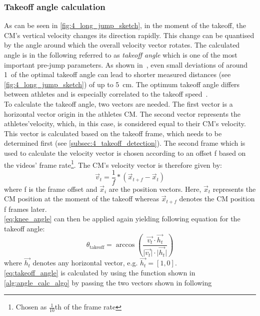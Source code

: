 \subsubsection*{Takeoff angle calculation}
As can be seen in \autoref{fig:4_long_jump_sketch}, in the moment of the
takeoff, the \ac{CM}'s vertical velocity changes its direction rapidly.
This change can be quantised by the angle around which the overall
velocity vector rotates.
The calculated angle is in the following referred to as \textit{takeoff angle}
which is one of the most important pre-jump parameters.
As shown in~\cite{seyfarth_optimum_2000}, even small deviations of around
1\textdegree\ of the optimal takeoff angle can lead to shorter measured
distances (see \autoref{fig:4_long_jump_sketch}) of up to 5~cm.
The optimum takeoff angle differs between athletes and is especially
correlated to the takeoff speed~\cite{tsuboi_mathematical_2010-1}.\\
To calculate the takeoff angle, two vectors are needed.
The first vector is a horizontal vector origin in the athletes \ac{CM}.
The second vector represents the athletes'velocity, which, in this case, 
is considered equal to their \ac{CM}'s velocity.
This vector is calculated based on the takeoff frame, which needs to be
determined first (see \autoref{subsec:4_takeoff_detection}).
The second frame which is used to calculate the velocity vector is chosen
according to an offset f based on the videos' frame
rate\footnote{Chosen as $\frac{1}{10}$th of the frame rate}.
The \ac{CM}'s velocity vector is therefore given by:
\begin{equation}
    \vec{{}v}_t = \frac{1}{f} * (\vec{{}x}_{t+f} - \vec{{}x}_t)
\end{equation}
where f is the frame offset and $\vec{{}x}_i$ are the position vectors.
Here, $\vec{{}x}_t$ represents the \ac{CM} position at the moment of the takeoff
whereas $\vec{{}x}_{t+f}$ denotes the \ac{CM} position f frames later.\\
\autoref{eq:knee_angle} can then be applied again yielding following equation
for the takeoff angle:
\begin{equation}\label{eq:takeoff_angle}
    \theta_{\text{takeoff}} = \arccos\left(\frac{\vec{v_t} \cdot \vec{h_t}}{\lvert\vec{v_t}\rvert \cdot \lvert\vec{h_t}\rvert}\right)
\end{equation}
where $\vec{h_t}$ denotes any horizontal vector, e.g. $\vec{h_t} = [1, 0]$.\\
\autoref{eq:takeoff_angle} is calculated by using the function shown in
\autoref{alg:angle_calc_algo} by passing the two vectors shown in following
